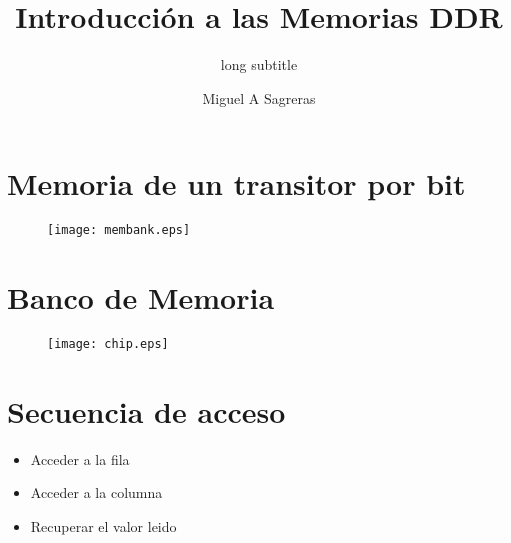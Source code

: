 \documentclass{beamer}
\title[Memoria DDR]{Introducción a las Memorias DDR}
\subtitle[short subtitle]{long subtitle}
\author[msagre]{Miguel A Sagreras}
\date[2015]{}
\begin{document}
\begin{frame}
\titlepage
\tableofcontents
\end{frame}

\section{Memoria de un transitor por bit}
\begin{frame}
\end{frame}

\begin{frame}
\begin{figure}[!htb]
\centering
\texttt{[image: membank.eps]}
\end{figure}
\end{frame}

\section{Banco de Memoria}
\begin{frame}
\begin{figure}[!htb]
\centering
\texttt{[image: chip.eps]}
\end{figure}
\end{frame}

\section{Secuencia de acceso}
\begin{frame}
	\begin{itemize}
		\item Acceder a la fila
		\item Acceder a la columna
		\item Recuperar el valor leido
	\end{itemize}
\end{frame}
\end{document}

